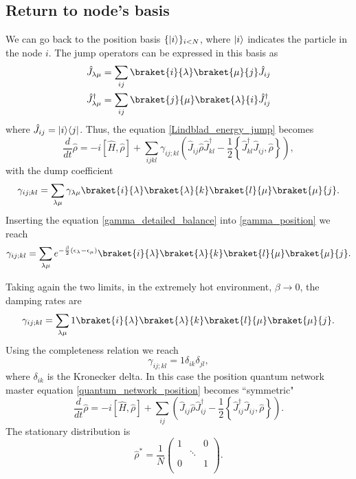 \subsection{Return to node's basis}
We can go back to the position basis $\{\lvert i\rangle\}_{i<N}$, where $\lvert i\rangle$ indicates the particle in the node $i$.  
The jump operators can be expressed in this basis as
\begin{align}
    \hat J_{\lambda\mu} = \sum_{ij} \braket{i}{\lambda}\braket{\mu}{j}\hat J_{ij}\\
    \hat J_{\lambda\mu}^\dagger = \sum_{ij} \braket{j}{\mu}\braket{\lambda}{i}\hat J_{ij}^\dagger
\end{align}
where $\hat J_{ij} = \lvert i\rangle\langle j\rvert$.
Thus, the equation \eqref{Lindblad_energy_jump} becomes
\begin{equation}\label{quantum_network_position}
    \frac{d}{dt}\hat\rho = -i\left[\hat H,\hat\rho\right] +\sum_{ijkl} \gamma_{ij;kl} \left(\hat J_{ij}\hat\rho \hat J_{kl}^\dagger - \frac{1}{2}\left\{ \hat J_{kl}^\dagger\hat J_{ij}, \hat\rho\right\} \right),
\end{equation}
with the dump coefficient
\begin{equation}\label{gamma_position}
    \gamma_{ij;kl}= \sum_{\lambda\mu}\gamma_{\lambda\mu}\braket{i}{\lambda}\braket{\lambda}{k}\braket{l}{\mu}\braket{\mu}{j}.
\end{equation}
Inserting the equation \eqref{gamma_detailed_balance} into \eqref{gamma_position} we reach
\begin{equation}
    \gamma_{ij;kl}= \sum_{\lambda\mu}e^{-\frac{\beta}{2}\left(\epsilon_\lambda - \epsilon_\mu\right)}\braket{i}{\lambda}\braket{\lambda}{k}\braket{l}{\mu}\braket{\mu}{j}.
\end{equation}

Taking again the two limits, in the extremely hot environment, $\beta \rightarrow 0$, the damping rates are
\begin{equation}
    \gamma_{ij;kl}= \sum_{\lambda\mu} 1 \braket{i}{\lambda}\braket{\lambda}{k}\braket{l}{\mu}\braket{\mu}{j}.
\end{equation}
Using the completeness relation we reach
\begin{equation}
    \gamma_{ij;kl} = 1 \delta_{ik}\delta_{jl},
\end{equation}
where $\delta_{ik}$ is the Kronecker delta.
In this case the position quantum network master equation \eqref{quantum_network_position} becomes “symmetric"
\begin{equation}
    \frac{d}{dt}\hat\rho = -i\left[\hat H,\hat\rho\right] +\sum_{ij}\left(\hat J_{ij}\hat\rho \hat J_{ij}^\dagger - \frac{1}{2}\left\{ \hat J_{ij}^\dagger\hat J_{ij}, \hat\rho\right\} \right).
\end{equation}
The stationary distribution is 
\begin{equation}
    \hat\rho^* = \frac{1}{N}\begin{pmatrix}
        1&&0\\
        &\ddots&\\
        0&&1\\
    \end{pmatrix}.
\end{equation}

